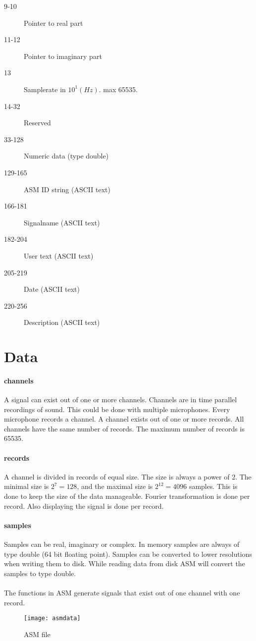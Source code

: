 \documentclass{report}
\begin{document}
\begin{description}
\item[9-10] Pointer to real part
\item[11-12] Pointer to imaginary part
\item[13] Samplerate in $10^{1} (Hz)$. max 65535.
\item[14-32] Reserved
\item[33-128] Numeric data (type double)
\item[129-165] ASM ID string (ASCII text)
\item[166-181] Signalname (ASCII text)
\item[182-204] User text (ASCII text)
\item[205-219] Date (ASCII text)
\item[220-256] Description (ASCII text)
\end{description}

\section{Data}

\paragraph{channels}
A signal can exist out of one or more channels. Channels
are in time parallel recordings of sound. This could be
done with multiple microphones. Every microphone records
a channel. A channel exists out of one or more records.
All channels have the same number of records. The maximum
number of records is 65535.

\paragraph{records}
A channel is divided in records of equal size. The size is always
a power of 2. The minimal size is $2^{7}=128$, and the
maximal size is $2^{12}=4096$ samples. This is done to
keep the size of the data manageable. Fourier transformation is
done per record. Also displaying the signal is done per record.

\paragraph{samples}
Samples can be real, imaginary or complex. In memory samples
are always of type double (64 bit floating point). Samples
can be converted to lower resolutions when writing them to disk.
While reading data from disk ASM will convert the samples to
type double.

\paragraph{}
The functions in ASM generate signals that exist out of one channel
with one record.

\begin{figure}[h]
\centerline{\texttt{[image: asmdata]}}
\caption{ASM file}
\label{fig:asmfile}
\end{figure}
\end{document}
